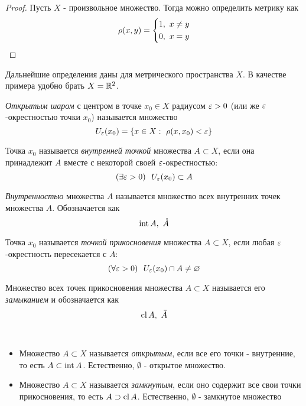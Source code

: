 \begin{proof}
	Пусть $X$ - произвольное множество.
	Тогда можно определить метрику как
	\[
		\rho(x, y) = \left\{\begin{aligned}
			&{1,\ x \neq y}
			\\
			&{0,\ x = y}
		\end{aligned}\right.
	\]
\end{proof}

\begin{note}
	Дальнейшие определения даны для метрического
	пространства $X$. В качестве примера удобно
	брать $X = \mathbb{R}^2$.
\end{note}

\begin{definition}
	\textit{Открытым шаром} с центром в точке
	$x_0 \in X$ радиусом $\varepsilon > 0$
	(или же $\varepsilon$-окрестностью точки $x_0$)
	называется множество
	\[
		U_\varepsilon(x_0) = \{x \in X :\  \rho(x, x_0) < \varepsilon\}
	\]
\end{definition}

\begin{definition}
	Точка $x_0$ называется \textit{внутренней точкой}
	множества $A \subset X$, если она принадлежит
	$A$ вместе с некоторой своей $\varepsilon$-окрестностью:
	\[
		(\exists \varepsilon > 0)\ \ U_\varepsilon(x_0) \subset A
	\]
\end{definition}

\begin{definition}
	\textit{Внутренностью} множества $A$ называется
	множество всех внутренних точек множества $A$.
	Обозначается как
	\[
		\Int A,\ \mc{A}
	\]
\end{definition}

\begin{definition}
	Точка $x_0$ называется \textit{точкой прикосновения}
	множества $A \subset X$, если любая $\varepsilon$-окрестность
	пересекается с $A$:
	\[
		(\forall \varepsilon > 0)\ \ U_\varepsilon(x_0) \cap A \neq \varnothing
	\]
\end{definition}

\begin{definition}
	Множество всех точек прикосновения множества
	$A \subset X$ называется его \textit{замыканием} и
	обозначается как
	\[
		\operatorname{cl} A,\ \bar{A}
	\]
\end{definition}

\begin{definition}~

	\begin{itemize}
		\item Множество $A \subset X$ называется
			\textit{открытым}, если все его точки - внутренние,
			то есть $A \subset \operatorname{int} A$.
			Естественно, $\emptyset$ - открытое множество.

		\item Множество $A \subset X$ называется
			\textit{замкнутым}, если оно содержит все свои
			точки прикосновения, то есть $A \supset \operatorname{cl} A$.
			Естественно, $\emptyset$ - замкнутое множество
	\end{itemize}
\end{definition}

